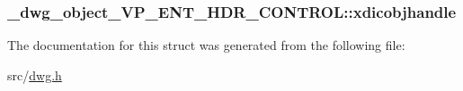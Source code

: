 \hypertarget{struct__dwg__object__VP__ENT__HDR__CONTROL_a44c9aac77d9825725ac4aabaeeaeb0e6}{
\subsubsection[{xdicobjhandle}]{ {\bf \-\_\-dwg\-\_\-object\-\_\-\-V\-P\-\_\-\-E\-N\-T\-\_\-\-H\-D\-R\-\_\-\-C\-O\-N\-T\-R\-O\-L\-::xdicobjhandle}}}\label{struct__dwg__object__VP__ENT__HDR__CONTROL_a44c9aac77d9825725ac4aabaeeaeb0e6}


\-The documentation for this struct was generated from the following file\-:\begin{DoxyCompactItemize}
\item 
src/\hyperlink{dwg_8h}{dwg.\-h}\end{DoxyCompactItemize}
